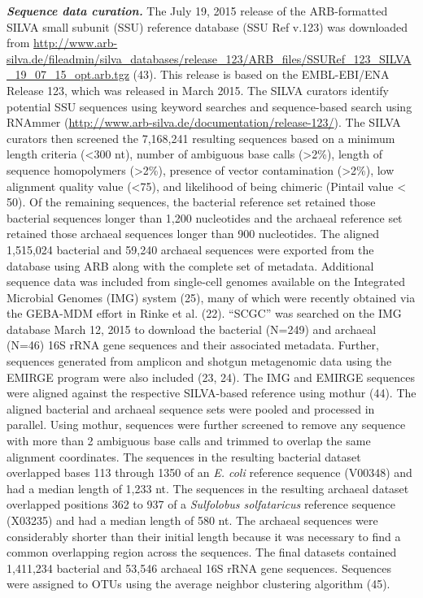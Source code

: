 \documentclass[11pt,]{article}
\begin{document}
\textbf{\emph{Sequence data curation.}} The July 19, 2015 release of the
ARB-formatted SILVA small subunit (SSU) reference database (SSU Ref
v.123) was downloaded from
\url{http://www.arb-silva.de/fileadmin/silva_databases/release_123/ARB_files/SSURef_123_SILVA_19_07_15_opt.arb.tgz}
(43). This release is based on the EMBL-EBI/ENA Release 123, which was
released in March 2015. The SILVA curators identify potential SSU
sequences using keyword searches and sequence-based search using RNAmmer
(\url{http://www.arb-silva.de/documentation/release-123/}). The SILVA
curators then screened the 7,168,241 resulting sequences based on a
minimum length criteria (\textless{}300 nt), number of ambiguous base
calls (\textgreater{}2\%), length of sequence homopolymers
(\textgreater{}2\%), presence of vector contamination
(\textgreater{}2\%), low alignment quality value (\textless{}75), and
likelihood of being chimeric (Pintail value \textless{} 50). Of the
remaining sequences, the bacterial reference set retained those
bacterial sequences longer than 1,200 nucleotides and the archaeal
reference set retained those archaeal sequences longer than 900
nucleotides. The aligned 1,515,024 bacterial and 59,240 archaeal
sequences were exported from the database using ARB along with the
complete set of metadata. Additional sequence data was included from
single-cell genomes available on the Integrated Microbial Genomes (IMG)
system (25), many of which were recently obtained via the GEBA-MDM
effort in Rinke et al. (22). ``SCGC'' was searched on the IMG database
March 12, 2015 to download the bacterial (N=249) and archaeal (N=46) 16S
rRNA gene sequences and their associated metadata. Further, sequences
generated from amplicon and shotgun metagenomic data using the EMIRGE
program were also included (23, 24). The IMG and EMIRGE sequences were
aligned against the respective SILVA-based reference using mothur (44).
The aligned bacterial and archaeal sequence sets were pooled and
processed in parallel. Using mothur, sequences were further screened to
remove any sequence with more than 2 ambiguous base calls and trimmed to
overlap the same alignment coordinates. The sequences in the resulting
bacterial dataset overlapped bases 113 through 1350 of an \emph{E. coli}
reference sequence (V00348) and had a median length of 1,233 nt. The
sequences in the resulting archaeal dataset overlapped positions 362 to
937 of a \emph{Sulfolobus solfataricus} reference sequence (X03235) and
had a median length of 580 nt. The archaeal sequences were considerably
shorter than their initial length because it was necessary to find a
common overlapping region across the sequences. The final datasets
contained 1,411,234 bacterial and 53,546 archaeal 16S rRNA gene
sequences. Sequences were assigned to OTUs using the average neighbor
clustering algorithm (45).
\end{document}
